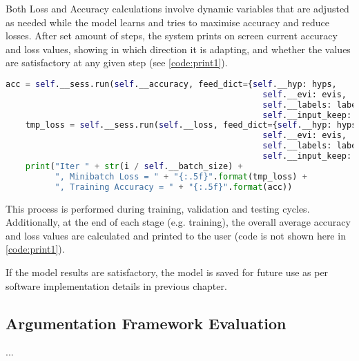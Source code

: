         Both Loss and Accuracy calculations involve dynamic variables that are adjusted as needed while the model learns and tries to maximise accuracy and reduce losses. After set amount of steps, the system prints on screen current accuracy and loss values, showing in which direction it is adapting, and whether the values are satisfactory at any given step (see \cref{code:print1}).
        
        \begin{lstlisting}[language=Python, caption=Accuracy and Loss Reporting, label=code:print1]
    acc = self.__sess.run(self.__accuracy, feed_dict={self.__hyp: hyps,
                                                    self.__evi: evis,
                                                    self.__labels: labels,
                                                    self.__input_keep: 0.1})
    tmp_loss = self.__sess.run(self.__loss, feed_dict={self.__hyp: hyps,
                                                    self.__evi: evis,
                                                    self.__labels: labels,
                                                    self.__input_keep: 0.1})
    print("Iter " + str(i / self.__batch_size) + 
          ", Minibatch Loss = " + "{:.5f}".format(tmp_loss) +
          ", Training Accuracy = " + "{:.5f}".format(acc))
        \end{lstlisting}
        
        This process is performed during training, validation and testing cycles. Additionally, at the end of each stage (e.g. training), the overall average accuracy and loss values are calculated and printed to the user (code is not shown here in \cref{code:print1}).
        
        If the model results are satisfactory, the model is saved for future use as per software implementation details in previous chapter.
        
    \subsection{Argumentation Framework Evaluation}
    
        ...